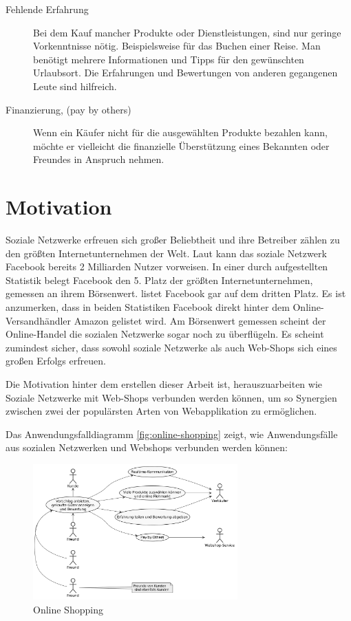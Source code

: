 \begin{description}
\item[Fehlende Erfahrung] Bei dem Kauf mancher Produkte oder Dienstleistungen, sind nur geringe Vorkenntnisse nötig. Beispielsweise für das Buchen einer Reise. Man benötigt mehrere Informationen und Tipps für den gewünschten Urlaubsort. Die Erfahrungen und Bewertungen von anderen gegangenen Leute sind hilfreich.
\item[Finanzierung, (pay by others)] Wenn ein Käufer nicht für die ausgewählten Produkte bezahlen kann, möchte er vielleicht die finanzielle Überstützung eines Bekannten oder Freundes in Anspruch nehmen.
\end{description}


\section{Motivation}

Soziale Netzwerke erfreuen sich großer Beliebtheit und ihre Betreiber zählen zu den größten Internetunternehmen der Welt. Laut \textcite{sokolov:facebook} kann das soziale Netzwerk Facebook bereits 2 Milliarden Nutzer vorweisen. In einer durch \textcite{nasdaq} aufgestellten Statistik belegt Facebook den 5. Platz der größten Internetunternehmen, gemessen an ihrem Börsenwert. \textcite{mittermeier} listet Facebook gar auf dem dritten Platz. Es ist anzumerken, dass in beiden Statistiken Facebook direkt hinter dem Online-Versandhändler Amazon gelistet wird. Am Börsenwert gemessen scheint der Online-Handel die sozialen Netzwerke sogar noch zu überflügeln. Es scheint zumindest sicher, dass sowohl soziale Netzwerke als auch Web-Shops sich eines großen Erfolgs erfreuen.

Die Motivation hinter dem erstellen dieser Arbeit ist, herauszuarbeiten wie Soziale Netzwerke mit Web-Shops verbunden werden können, um so Synergien zwischen zwei der populärsten Arten von Webapplikation zu ermöglichen.

Das Anwendungsfalldiagramm \vref{fig:online-shopping} zeigt, wie Anwendungsfälle aus sozialen Netzwerken und Webshops verbunden werden können:

\begin{figure}[htbp]
	\centering
	\includegraphics[width=0.7\textwidth]{uml-diagramme/online-shopping.png}
	\caption{Online Shopping}
	\label{fig:online-shopping}
\end{figure}


